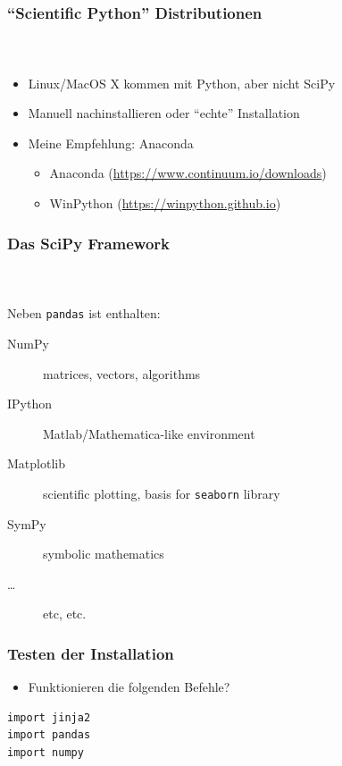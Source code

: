 \documentclass[12pt,ngerman]{beamer}
\begin{document}
\begin{frame}
\frametitle{\enquote{Scientific Python} Distributionen}
\framesubtitle{~}

\begin{itemize}
	\item Linux/MacOS X kommen mit Python, aber nicht SciPy
	\item Manuell nachinstallieren oder \enquote{echte} Installation
	\item Meine Empfehlung: Anaconda
\begin{itemize}
	\item Anaconda (\url{https://www.continuum.io/downloads})
	\item WinPython (\url{https://winpython.github.io})
\end{itemize}
	\end{itemize}
	
\begin{center} %
\end{center}	
\end{frame}

\begin{frame}
\frametitle{Das SciPy Framework}
\framesubtitle{~}

Neben \texttt{pandas} ist enthalten:

\begin{description}
\item[NumPy] matrices, vectors, algorithms
\item[IPython] Matlab/Mathematica-like environment 
\item[Matplotlib] scientific plotting, basis for \texttt{seaborn} library
\item[SymPy] symbolic mathematics
\item [\ldots] etc, etc.
\end{description}
\end{frame}


\begin{frame}[containsverbatim]
\frametitle{Testen der Installation}

\begin{itemize}
	\item Funktionieren die folgenden Befehle?
\end{itemize}

\begin{lstlisting}
import jinja2
import pandas
import numpy
\end{lstlisting}
\end{frame}
\end{document}
